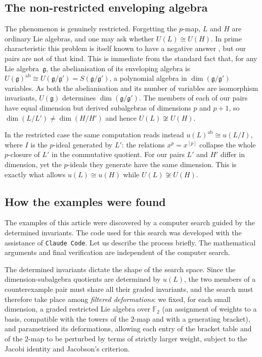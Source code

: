 \documentclass[11pt,reqno]{amsart}
\theoremstyle{plain}
\theoremstyle{remark}
\newcommand{\Ft}{\mathbb{F}_2}
\begin{document}
\subsection*{The non-restricted enveloping algebra}

The phenomenon is genuinely restricted. Forgetting the $p$-map, $L$ and $H$
are ordinary Lie algebras, and one may ask whether $U(L)\cong U(H)$. In prime
characteristic this problem is itself known to have a negative answer
\cite{RileyUsefi,SchneiderUsefi}, but our pairs are not of that kind. This is
immediate from the standard fact that, for any Lie algebra~$\mathfrak g$, the
abelianisation of its enveloping algebra is
$U(\mathfrak g)^{\mathrm{ab}}\cong U(\mathfrak g/\mathfrak g')=S(\mathfrak g/\mathfrak g')$,
a polynomial algebra in $\dim(\mathfrak g/\mathfrak g')$ variables. As both
the abelianisation and its number of variables are isomorphism invariants,
$U(\mathfrak g)$ determines $\dim(\mathfrak g/\mathfrak g')$. The members of
each of our pairs have equal dimension but derived subalgebras of dimensions
$p$ and $p+1$, so $\dim(L/L')\ne\dim(H/H')$ and hence $U(L)\not\cong U(H)$.

In the restricted case the same computation reads instead
$u(L)^{\mathrm{ab}}\cong u(L/I)$, where $I$ is the $p$-ideal generated by $L'$:
the relations $x^p=x^{[p]}$ collapse the whole $p$-closure of $L'$ in the
commutative quotient. For our pairs $L'$ and $H'$ differ in dimension, yet the
$p$-ideals they generate have the same dimension. This is exactly what allows
$u(L)\cong u(H)$ while $U(L)\not\cong U(H)$.


\subsection*{How the examples were found}

The examples of this article were discovered by a computer search guided by
the determined invariants. 
The code used for this search was developed with the assistance of \texttt{Claude Code}.
Let us describe the process briefly. The mathematical arguments and final verification are independent of the
computer search.

The determined invariants dictate the shape of the search space. Since the
dimension-subalgebra quotients are determined by
$u(L)$, the two members of a counterexample pair must share
all their graded invariants, and the search must therefore take place among
\emph{filtered deformations}: we fixed, for each small dimension, a graded
restricted Lie algebra over $\Ft$ (an assignment of weights to a basis,
compatible with the towers of the $2$-map and with a generating
bracket), and parametrised its deformations, allowing each entry of the
bracket table and of the $2$-map to be perturbed by terms of strictly
larger weight, subject to the Jacobi identity and Jacobson's criterion.
\end{document}
